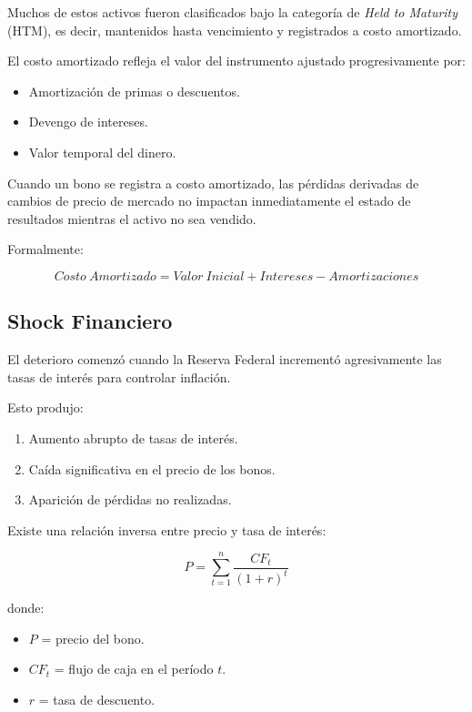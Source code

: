Muchos de estos activos fueron clasificados bajo la categoría de \textit{Held to Maturity} (HTM), es decir, mantenidos hasta vencimiento y registrados a costo amortizado.

El costo amortizado refleja el valor del instrumento ajustado progresivamente por:

\begin{itemize}
    \item Amortización de primas o descuentos.
    \item Devengo de intereses.
    \item Valor temporal del dinero.
\end{itemize}

\begin{tcolorbox}[colback=gray!8,colframe=black,title=Nota Técnica]
Cuando un bono se registra a costo amortizado, las pérdidas derivadas de cambios de precio de mercado no impactan inmediatamente el estado de resultados mientras el activo no sea vendido.
\end{tcolorbox}

Formalmente:

\[
Costo\ Amortizado = Valor\ Inicial + Intereses - Amortizaciones
\]

\subsection{Shock Financiero}

El deterioro comenzó cuando la Reserva Federal incrementó agresivamente las tasas de interés para controlar inflación.

Esto produjo:

\begin{enumerate}
    \item Aumento abrupto de tasas de interés.
    \item Caída significativa en el precio de los bonos.
    \item Aparición de pérdidas no realizadas.
\end{enumerate}

Existe una relación inversa entre precio y tasa de interés:

\[
P = \sum_{t=1}^{n}\frac{CF_t}{(1+r)^t}
\]

donde:

\begin{itemize}
    \item $P$ = precio del bono.
    \item $CF_t$ = flujo de caja en el período $t$.
    \item $r$ = tasa de descuento.
\end{itemize}

